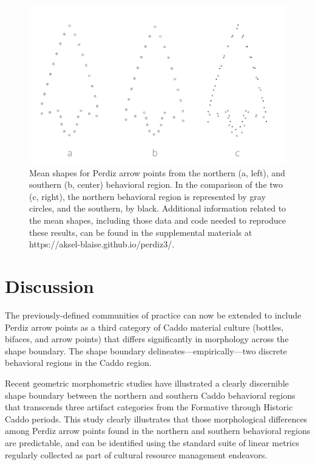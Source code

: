 \documentclass[smallextended]{svjour3}       %
\begin{document}
\begin{figure}
\includegraphics[width=1\linewidth]{ms-figs/figure5} \caption{Mean shapes for Perdiz arrow points from the northern (a, left), and southern (b, center) behavioral region. In the comparison of the two (c, right), the northern behavioral region is represented by gray circles, and the southern, by black. Additional information related to the mean shapes, including those data and code needed to reproduce these results, can be found in the supplemental materials at https://aksel-blaise.github.io/perdiz3/.}\label{fig:fig5}
\end{figure}

\hypertarget{discussion}{%
\section{Discussion}\label{discussion}}

The previously-defined communities of practice can now be extended to
include Perdiz arrow points as a third category of Caddo material
culture (bottles, bifaces, and arrow points) that differs significantly
in morphology across the shape boundary. The shape boundary
delineates---empirically---two discrete behavioral regions in the Caddo
region.

Recent geometric morphometric studies have illustrated a clearly
discernible shape boundary between the northern and southern Caddo
behavioral regions that transcends three artifact categories from the
Formative through Historic Caddo periods. This study clearly illustrates
that those morphological differences among Perdiz arrow points found in
the northern and southern behavioral regions are predictable, and can be
identified using the standard suite of linear metrics regularly
collected as part of cultural resource management endeavors.
\end{document}

